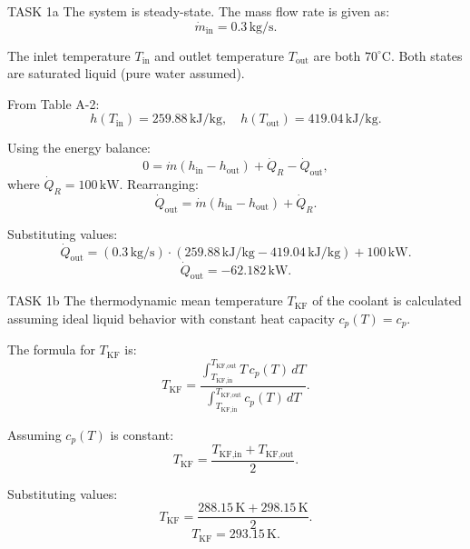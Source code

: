 TASK 1a  
The system is steady-state.  
The mass flow rate is given as:  
\[
\dot{m}_{\text{in}} = 0.3 \, \text{kg/s}.
\]  

The inlet temperature \( T_{\text{in}} \) and outlet temperature \( T_{\text{out}} \) are both \( 70^\circ\text{C} \). Both states are saturated liquid (pure water assumed).  

From Table A-2:  
\[
h(T_{\text{in}}) = 259.88 \, \text{kJ/kg}, \quad h(T_{\text{out}}) = 419.04 \, \text{kJ/kg}.
\]  

Using the energy balance:  
\[
0 = \dot{m} (h_{\text{in}} - h_{\text{out}}) + \dot{Q}_R - \dot{Q}_{\text{out}},
\]  
where \( \dot{Q}_R = 100 \, \text{kW} \). Rearranging:  
\[
\dot{Q}_{\text{out}} = \dot{m} (h_{\text{in}} - h_{\text{out}}) + \dot{Q}_R.
\]  

Substituting values:  
\[
\dot{Q}_{\text{out}} = (0.3 \, \text{kg/s}) \cdot (259.88 \, \text{kJ/kg} - 419.04 \, \text{kJ/kg}) + 100 \, \text{kW}.
\]  
\[
\dot{Q}_{\text{out}} = -62.182 \, \text{kW}.
\]  

TASK 1b  
The thermodynamic mean temperature \( T_{\text{KF}} \) of the coolant is calculated assuming ideal liquid behavior with constant heat capacity \( c_p(T) = c_p \).  

The formula for \( T_{\text{KF}} \) is:  
\[
T_{\text{KF}} = \frac{\int_{T_{\text{KF,in}}}^{T_{\text{KF,out}}} T \, c_p(T) \, dT}{\int_{T_{\text{KF,in}}}^{T_{\text{KF,out}}} c_p(T) \, dT}.
\]  

Assuming \( c_p(T) \) is constant:  
\[
T_{\text{KF}} = \frac{T_{\text{KF,in}} + T_{\text{KF,out}}}{2}.
\]  

Substituting values:  
\[
T_{\text{KF}} = \frac{288.15 \, \text{K} + 298.15 \, \text{K}}{2}.
\]  
\[
T_{\text{KF}} = 293.15 \, \text{K}.
\]